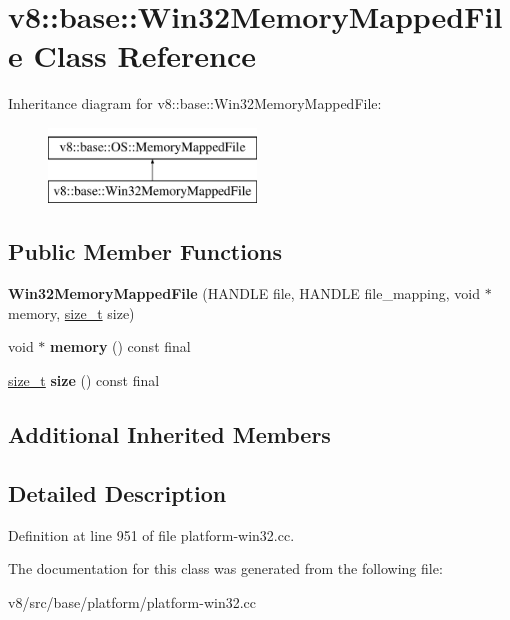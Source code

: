 \hypertarget{classv8_1_1base_1_1Win32MemoryMappedFile}{}\section{v8\+:\+:base\+:\+:Win32\+Memory\+Mapped\+File Class Reference}
\label{classv8_1_1base_1_1Win32MemoryMappedFile}
Inheritance diagram for v8\+:\+:base\+:\+:Win32\+Memory\+Mapped\+File\+:\begin{figure}[H]
\begin{center}
\leavevmode
\includegraphics[height=2.000000cm]{classv8_1_1base_1_1Win32MemoryMappedFile}
\end{center}
\end{figure}
\subsection*{Public Member Functions}
\begin{DoxyCompactItemize}
\item 
\mbox{\label{classv8_1_1base_1_1Win32MemoryMappedFile_ae1e188f285fecab7d70a09ef5a796a5a}} 
{\bfseries Win32\+Memory\+Mapped\+File} (H\+A\+N\+D\+LE file, H\+A\+N\+D\+LE file\+\_\+mapping, void $\ast$memory, \mbox{\hyperlink{classsize__t}{size\+\_\+t}} size)
\item 
\mbox{\label{classv8_1_1base_1_1Win32MemoryMappedFile_a6e75caaea85c6bde8915c4f05bde6d38}} 
void $\ast$ {\bfseries memory} () const final
\item 
\mbox{\label{classv8_1_1base_1_1Win32MemoryMappedFile_ab2db1d85efad14a749c1f4d7976395c8}} 
\mbox{\hyperlink{classsize__t}{size\+\_\+t}} {\bfseries size} () const final
\end{DoxyCompactItemize}
\subsection*{Additional Inherited Members}


\subsection{Detailed Description}


Definition at line 951 of file platform-\/win32.\+cc.



The documentation for this class was generated from the following file\+:\begin{DoxyCompactItemize}
\item 
v8/src/base/platform/platform-\/win32.\+cc\end{DoxyCompactItemize}
